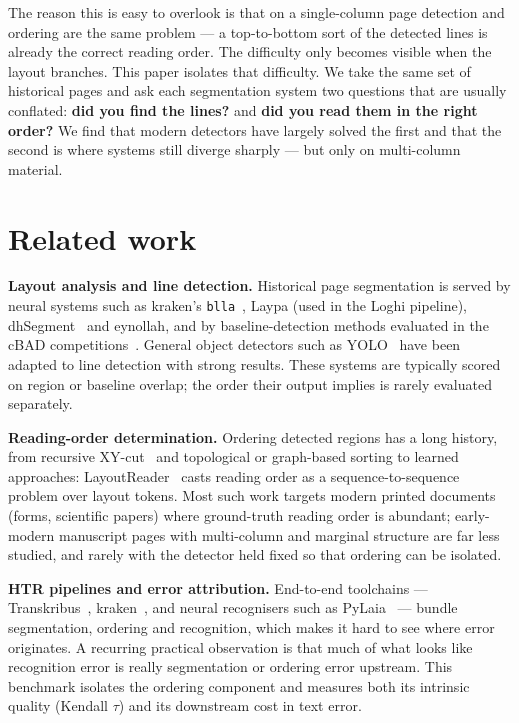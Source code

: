 \documentclass[11pt]{article}
\newcommand{\tw}{\ensuremath{\tau}}
\begin{document}
The reason this is easy to overlook is that on a single-column page detection and
ordering are the same problem --- a top-to-bottom sort of the detected lines is
already the correct reading order. The difficulty only becomes visible when the
layout branches. This paper isolates that difficulty. We take the same set of
historical pages and ask each segmentation system two questions that are usually
conflated: \textbf{did you find the lines?} and \textbf{did you read them in the
right order?} We find that modern detectors have largely solved the first and that
the second is where systems still diverge sharply --- but only on multi-column
material.

\section{Related work}

\textbf{Layout analysis and line detection.} Historical page segmentation is
served by neural systems such as kraken's \texttt{blla}~\cite{kraken}, Laypa
(used in the Loghi pipeline), dhSegment~\cite{dhsegment} and eynollah, and by
baseline-detection methods evaluated in the cBAD competitions~\cite{cbad}.
General object detectors such as YOLO~\cite{yolov8} have been adapted to line
detection with strong results. These systems are typically scored on region or
baseline overlap; the order their output implies is rarely evaluated separately.

\textbf{Reading-order determination.} Ordering detected regions has a long
history, from recursive XY-cut~\cite{xycut} and topological or graph-based
sorting to learned approaches: LayoutReader~\cite{layoutreader} casts reading
order as a sequence-to-sequence problem over layout tokens. Most such work
targets modern printed documents (forms, scientific papers) where ground-truth
reading order is abundant; early-modern manuscript pages with multi-column and
marginal structure are far less studied, and rarely with the detector held fixed
so that ordering can be isolated.

\textbf{HTR pipelines and error attribution.} End-to-end toolchains ---
Transkribus~\cite{transkribus}, kraken~\cite{kraken}, and neural recognisers such
as PyLaia~\cite{pylaia} --- bundle segmentation, ordering and recognition, which
makes it hard to see where error originates. A recurring practical observation is
that much of what looks like recognition error is really segmentation or ordering
error upstream. This benchmark isolates the ordering component and measures both
its intrinsic quality (Kendall \tw{}) and its downstream cost in text error.
\end{document}
